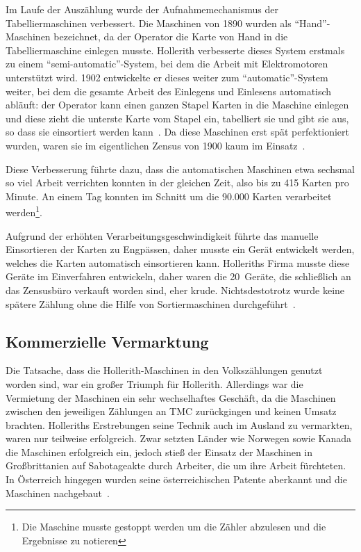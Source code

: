 \documentclass[parskip=half]{scrartcl}
\begin{document}
Im Laufe der Auszählung wurde der Aufnahmemechanismus der Tabelliermaschinen
verbessert. Die Maschinen von 1890 wurden als \enquote{Hand}-Maschinen
bezeichnet, da der Operator die Karte von Hand in die Tabelliermaschine
einlegen musste. Hollerith verbesserte dieses System erstmals zu einem
\enquote{semi-automatic}-System, bei dem die Arbeit mit Elektromotoren
unterstützt wird. 1902 entwickelte er dieses weiter zum
\enquote{automatic}-System weiter, bei dem die gesamte Arbeit des Einlegens und
Einlesens automatisch abläuft: der Operator kann einen ganzen Stapel Karten in
die Maschine einlegen und diese zieht die unterste Karte vom Stapel ein,
tabelliert sie und gibt sie aus, so dass sie einsortiert werden
kann~\cite{austrian1982herman}. Da diese Maschinen erst spät perfektioniert
wurden, waren sie im eigentlichen Zensus von 1900 kaum im
Einsatz~\cite{truesdell1965development}.

Diese Verbesserung führte dazu, dass die automatischen Maschinen etwa sechsmal
so viel Arbeit verrichten konnten in der gleichen Zeit, also bis zu 415 Karten
pro Minute. An einem Tag konnten im Schnitt um die 90.000 Karten verarbeitet
werden\footnote{Die Maschine musste gestoppt werden um die Zähler abzulesen und
die Ergebnisse zu notieren}.

Aufgrund der erhöhten Verarbeitungsgeschwindigkeit führte das manuelle
Einsortieren der Karten zu Engpässen, daher musste ein Gerät entwickelt werden,
welches die Karten automatisch einsortieren kann. Holleriths Firma musste diese
Geräte im Einverfahren entwickeln, daher waren die 20~Geräte, die schließlich an
das Zensusbüro verkauft worden sind, eher krude. Nichtsdestotrotz wurde keine
spätere Zählung ohne die Hilfe von Sortiermaschinen
durchgeführt~\cite{truesdell1965development}.

\subsection{Kommerzielle Vermarktung}
\label{sec:commerce}

Die Tatsache, dass die Hollerith-Maschinen in den Volkszählungen genutzt worden
sind, war ein großer Triumph für Hollerith. Allerdings war die Vermietung der
Maschinen ein sehr wechselhaftes Geschäft, da die Maschinen zwischen den
jeweiligen Zählungen an TMC zurückgingen und keinen Umsatz brachten.
Holleriths Erstrebungen seine Technik auch im Ausland zu vermarkten, waren nur
teilweise erfolgreich. Zwar setzten Länder wie Norwegen sowie Kanada die
Maschinen erfolgreich ein, jedoch stieß der Einsatz der Maschinen in
Großbrittanien auf Sabotageakte durch Arbeiter, die um ihre Arbeit fürchteten.
In Österreich hingegen wurden seine österreichischen Patente aberkannt und die Maschinen
nachgebaut~\cite{austrian1982herman}.
\end{document}

